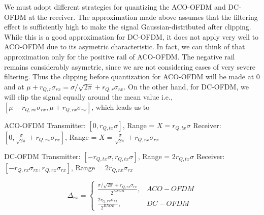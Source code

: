 \documentclass[a4paper]{article}
\begin{document}
We must adopt different strategies for quantizing the ACO-OFDM and DC-OFDM at the receiver. The approximation made above assumes that the filtering effect is sufficiently high to make the signal Gaussian-distributed after clipping. While this is a good approximation for DC-OFDM, it does not apply very well to ACO-OFDM due to its asymetric characteristic. In fact, we can think of that approximation only for the positive rail of ACO-OFDM. The negative rail remains considerably asymetric, since we are not considering cases of very severe filtering. Thus the clipping before quantization for ACO-OFDM will be made at 0 and at $\mu + r_{Q,r}\sigma_{rx} = \sigma/\sqrt{2\pi} + r_{Q,r}\sigma_{rx}$. On the other hand, for DC-OFDM, we will clip the signal equally around the mean value i.e., $[\mu - r_{Q,rx}\sigma_{rx}, \mu + r_{Q,rx}\sigma_{rx}]$, which leads us to

ACO-OFDM
Transmitter: $[0, r_{Q,tx}\sigma]$, Range = $X = r_{Q,tx}\sigma$
Receiver: $[0, \frac{\sigma}{\sqrt{2\pi}}+ r_{Q,rx}\sigma_{rx}]$, Range = $X =  \frac{\sigma}{\sqrt{2\pi}}+ r_{Q,rx}\sigma_{rx}$


DC-OFDM
Transmitter: $[-r_{Q,tx}\sigma, r_{Q,tx}\sigma]$, Range = $2r_{Q,tx}\sigma$
Receiver: $[-r_{Q,rx}\sigma_{rx}, r_{Q,rx}\sigma_{rx}]$, Range = $2r_{Q,rx}\sigma_{rx}$


\begin{equation}
\Delta_{rx} = \begin{cases}
\frac{\sigma/\sqrt{2\pi} + r_{Q,rx}\sigma_{rx}}{2^{ENOB}}, & ACO-OFDM \\
\frac{2r_{Q,rx}\sigma_{rx}}{2^{ENOB}}, & DC-OFDM 
\end{cases}
\end{equation}
\end{document}
